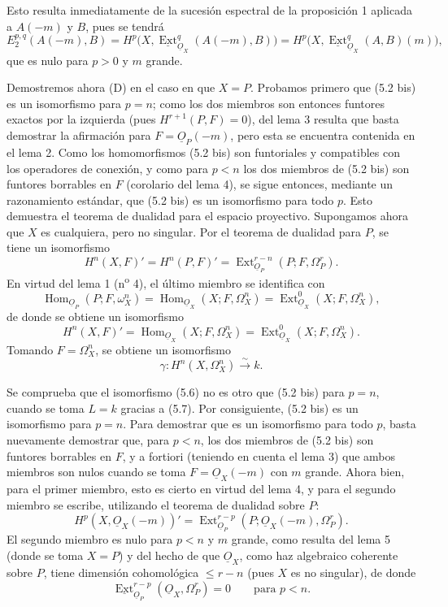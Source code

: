 \documentclass[11pt,twoside,openany]{book}
\numberwithin{equation}{section}
\newcommand{\src}[1]{%
  \phantomsection\hypertarget{src:#1}{}%
  \marginpar{\raggedleft\footnotesize\sffamily #1}%
}
\newcommand{\Osh}{\underline{O}}
\newcommand{\Extsh}{\underline{\operatorname{Ext}}}
\theoremstyle{plain}
\theoremstyle{definition}
\theoremstyle{remark}
\newcommand{\FgaUnitKey}{frontmatter}
\renewcommand{\src}[1]{%
  \phantomsection\hypertarget{src:\FgaUnitKey:#1}{}%
  \marginpar{\raggedleft\footnotesize\sffamily #1}%
}
\theoremstyle{plain}
\theoremstyle{definition}
\theoremstyle{remark}
\begin{document}
Esto resulta inmediatamente de la sucesión espectral de la proposición 1 aplicada a
$A(-m)$ y $B$, pues se tendrá
\[
  E_{2}^{p,q}(A(-m),B)
  =H^{p}\bigl(X,\Extsh_{\Osh_X}^{q}(A(-m),B)\bigr)
  =H^{p}\bigl(X,\Extsh_{\Osh_X}^{q}(A,B)(m)\bigr),
\]
que es nulo para $p>0$ y $m$ grande.

Demostremos ahora (D) en el caso en que $X=P$. Probamos primero que (5.2 bis)
es un isomorfismo para $p=n$; como los dos miembros son entonces
funtores exactos por la izquierda (pues $H^{r+1}(P,F)=0$), del lema 3 resulta
que basta demostrar la afirmación para $F=\Osh_P(-m)$, pero esta se encuentra
contenida en el lema 2. Como los homomorfismos (5.2 bis) son funtoriales y
compatibles con los operadores de conexión, y como para $p<n$ los dos miembros de
(5.2 bis) son funtores borrables en $F$ (corolario del lema 4), se
sigue entonces, mediante un razonamiento estándar, que (5.2 bis) es un isomorfismo
para todo $p$. Esto demuestra el teorema de dualidad para el espacio proyectivo.
Supongamos ahora que $X$ es cualquiera, pero no singular. Por el teorema de
dualidad para $P$, se tiene un isomorfismo
\[
  H^{n}(X,F)'=H^{n}(P,F)'
  =\operatorname{Ext}_{\Osh_P}^{r-n}(P;F,\Omega_P^{r}).
\]
En virtud del lema 1 (n\textsuperscript{o} 4), el último miembro se identifica con
\[
  \operatorname{Hom}_{\Osh_P}(P;F,\omega_X^{n})
  =\operatorname{Hom}_{\Osh_X}(X;F,\Omega_X^{n})
  =\operatorname{Ext}_{\Osh_X}^{0}(X;F,\Omega_X^{n}),
\]
de donde se obtiene un isomorfismo
\begin{equation}\tag{5.6}
  H^{n}(X,F)'=\operatorname{Hom}_{\Osh_X}(X;F,\Omega_X^{n})
  =\operatorname{Ext}_{\Osh_X}^{0}(X;F,\Omega_X^{n}).
\end{equation}
Tomando $F=\Omega_X^{n}$, se obtiene un isomorfismo
\begin{equation}\tag{5.7}
  \gamma:H^{n}(X,\Omega_X^{n})\xrightarrow{\sim}k.
\end{equation}

\src{185}
Se comprueba que el isomorfismo (5.6) no es otro que (5.2 bis) para $p=n$, cuando
se toma $L=k$ gracias a (5.7). Por consiguiente, (5.2 bis) es un isomorfismo para
$p=n$. Para demostrar que es un isomorfismo para todo $p$, basta nuevamente
demostrar que, para $p<n$, los dos miembros de (5.2 bis) son funtores
borrables en $F$, y a fortiori (teniendo en cuenta el lema 3) que ambos miembros
son nulos cuando se toma $F=\Osh_X(-m)$ con $m$ grande. Ahora bien, para el primer
miembro, esto es cierto en virtud del lema 4, y para el segundo miembro se escribe,
utilizando el teorema de dualidad sobre $P$:
\[
  H^{p}(X,\Osh_X(-m))'
  =\operatorname{Ext}_{\Osh_P}^{r-p}
    (P;\Osh_X(-m),\Omega_P^{r}).
\]
El segundo miembro es nulo para $p<n$ y $m$ grande, como resulta del lema 5
(donde se toma $X=P$) y del hecho de que $\Osh_X$, como haz algebraico
coherente sobre $P$, tiene dimensión cohomológica $\leq r-n$ (pues $X$ es no
singular), de donde
\[
  \Extsh_{\Osh_P}^{r-p}(\Osh_X,\Omega_P^{r})=0
  \qquad\text{para }p<n.
\]
\end{document}
